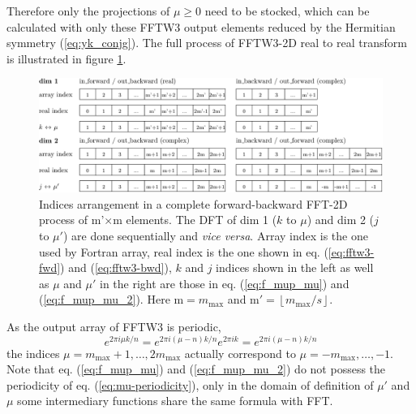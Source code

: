Therefore only the projections of $\mu\geq0$ need to be stocked,
which can be calculated with only these FFTW3 output elements reduced
by the Hermitian symmetry (\ref{eq:yk_conjg}). The full process of
FFTW3-2D real to real transform is illustrated in figure \ref{fig:FFTW3-2D-indices}.

\begin{figure}[h]
\centering{}%
\noindent\begin{minipage}[t]{1\textwidth}%
\begin{center}
\includegraphics[width=1\textwidth]{_figure/fftw3_indices}
\par\end{center}
\begin{center}
\caption[Indices arrangement in a complete forward-backward FFT-2D process
of m'$\times$m elements]{Indices arrangement in a complete forward-backward \acs{FFT}-2D
process of m'$\times$m elements. The \acs{DFT} of dim 1 ($k$ to
$\mu$) and dim 2 ($j$ to $\mu'$) are done sequentially and \emph{vice
versa}. Array index is the one used by Fortran array, real index is
the one shown in eq. (\ref{eq:fftw3-fwd}) and (\ref{eq:fftw3-bwd}),
$k$ and $j$ indices shown in the left as well as $\mu$ and $\mu'$
in the right are those in eq. (\ref{eq:f_mup_mu}) and (\ref{eq:f_mup_mu_2}).
Here $\mathrm{m}=m_{\mathrm{max}}$ and $\mathrm{m}'=\left\lfloor m_{\mathrm{max}}/s\right\rfloor $.
\label{fig:FFTW3-2D-indices}}
\par\end{center}%
\end{minipage}
\end{figure}

As the output array of FFTW3 is periodic,
\begin{equation}
e^{2\pi i\mu k/n}=e^{2\pi i(\mu-n)k/n}e^{2\pi ik}=e^{2\pi i(\mu-n)k/n}\label{eq:mu-periodicity}
\end{equation}
the indices $\mu=m_{\mathrm{max}}+1,\ldots,2m_{\mathrm{max}}$ actually
correspond to $\mu=-m_{\mathrm{max}},\ldots,-1$. Note that eq. (\ref{eq:f_mup_mu})
and (\ref{eq:f_mup_mu_2}) do not possess the periodicity of eq. (\ref{eq:mu-periodicity}),
only in the domain of definition of $\mu'$ and $\mu$ some intermediary
functions share the same formula with \acs{FFT}.

